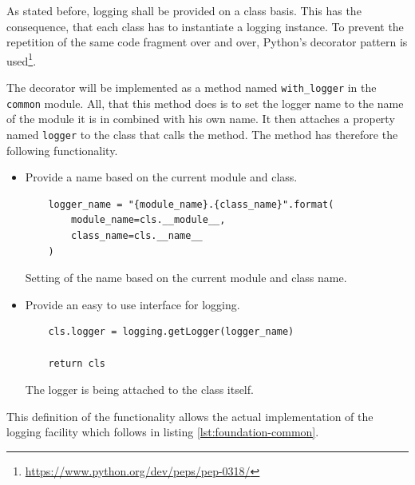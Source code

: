 \documentclass[10pt, openright, notitlepage]{scrreprt}
\begin{document}
As stated before, logging shall be provided on a class basis. This has the
consequence, that each class has to instantiate a logging instance. To prevent
the repetition of the same code fragment over and over, Python's decorator
pattern is used\footnote{\url{https://www.python.org/dev/peps/pep-0318/}}.

The decorator will be implemented as a method named \texttt{with\_logger} in
the \texttt{common} module. All, that this method does is to set the logger
name to the name of the module it is in combined with his own name. It then
attaches a property named \texttt{logger} to the class that calls the method.
The method has therefore the following functionality.

\begin{itemize}
\item Provide a name based on the current module and class.
\begin{listing}[H]
\begin{verbatim}
    logger_name = "{module_name}.{class_name}".format(
        module_name=cls.__module__,
        class_name=cls.__name__
    )
\end{verbatim}
\caption{\label{logger-name}
Setting of the name based on the current module and class name.}
\end{listing}
\item Provide an easy to use interface for logging.
\begin{listing}[H]
\begin{verbatim}
    cls.logger = logging.getLogger(logger_name)
    
    return cls
\end{verbatim}
\caption{\label{logger-return-logger}
The logger is being attached to the class itself.}
\end{listing}
\end{itemize}

This definition of the functionality allows the actual implementation of the
logging facility which follows in listing \ref{lst:foundation-common}.
\end{document}

